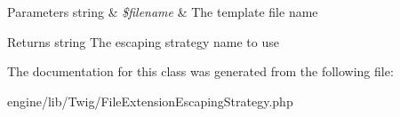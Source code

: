 \begin{DoxyParams}[1]{Parameters}
string & {\em \$filename} & The template file name\\
\hline
\end{DoxyParams}
\begin{DoxyReturn}{Returns}
string The escaping strategy name to use 
\end{DoxyReturn}


The documentation for this class was generated from the following file\+:\begin{DoxyCompactItemize}
\item 
engine/lib/\+Twig/File\+Extension\+Escaping\+Strategy.\+php\end{DoxyCompactItemize}
